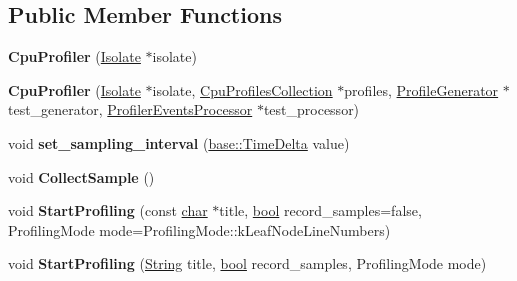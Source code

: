\subsection*{Public Member Functions}
\begin{DoxyCompactItemize}
\item 
\mbox{\label{classv8_1_1internal_1_1CpuProfiler_a58e54bb45700330634856222e2f1dffd}} 
{\bfseries Cpu\+Profiler} (\mbox{\hyperlink{classv8_1_1internal_1_1Isolate}{Isolate}} $\ast$isolate)
\item 
\mbox{\label{classv8_1_1internal_1_1CpuProfiler_a77f0537da41544e43bd55833c4d89d0c}} 
{\bfseries Cpu\+Profiler} (\mbox{\hyperlink{classv8_1_1internal_1_1Isolate}{Isolate}} $\ast$isolate, \mbox{\hyperlink{classv8_1_1internal_1_1CpuProfilesCollection}{Cpu\+Profiles\+Collection}} $\ast$profiles, \mbox{\hyperlink{classv8_1_1internal_1_1ProfileGenerator}{Profile\+Generator}} $\ast$test\+\_\+generator, \mbox{\hyperlink{classv8_1_1internal_1_1ProfilerEventsProcessor}{Profiler\+Events\+Processor}} $\ast$test\+\_\+processor)
\item 
\mbox{\label{classv8_1_1internal_1_1CpuProfiler_a967c226a0cbbcd9244269645ad3a1c0d}} 
void {\bfseries set\+\_\+sampling\+\_\+interval} (\mbox{\hyperlink{classv8_1_1base_1_1TimeDelta}{base\+::\+Time\+Delta}} value)
\item 
\mbox{\label{classv8_1_1internal_1_1CpuProfiler_a0ef016f320d592f5b72d1c56a70a6a2f}} 
void {\bfseries Collect\+Sample} ()
\item 
\mbox{\label{classv8_1_1internal_1_1CpuProfiler_a7b008c841e19ddb3cad52f133b99d8ef}} 
void {\bfseries Start\+Profiling} (const \mbox{\hyperlink{classchar}{char}} $\ast$title, \mbox{\hyperlink{classbool}{bool}} record\+\_\+samples=false, Profiling\+Mode mode=Profiling\+Mode\+::k\+Leaf\+Node\+Line\+Numbers)
\item 
\mbox{\label{classv8_1_1internal_1_1CpuProfiler_aed656ad09ab027b8ec051160d166c4be}} 
void {\bfseries Start\+Profiling} (\mbox{\hyperlink{classv8_1_1internal_1_1String}{String}} title, \mbox{\hyperlink{classbool}{bool}} record\+\_\+samples, Profiling\+Mode mode)

\end{DoxyCompactItemize}
